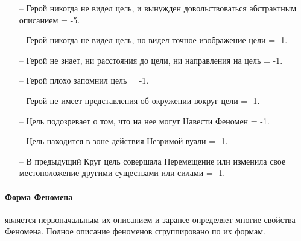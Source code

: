 \begin{itemize}
\item[--]Герой никогда не видел цель, и вынужден довольствоваться абстрактным описанием = -5.
\item[--]Герой никогда не видел цель, но видел точное изображение цели = -1.
\item[--]Герой не знает, ни расстояния до цели, ни направления на цель = -1.
\item[--]Герой плохо запомнил цель = -1.
\item[--]Герой не имеет представления об окружении вокруг цели = -1.
\item[--]Цель подозревает о том, что на нее могут Навести Феномен = -1.
\item[--]Цель находится в зоне действия Незримой вуали = -1.
\item[--]В предыдущий Круг цель совершала Перемещение или изменила свое местоположение другими существами или силами = -1.
\end{itemize}

\paragraph{Форма Феномена} является первоначальным их описанием и заранее определяет многие свойства Феномена.
\newline Полное описание феноменов сгруппировано по их формам.

